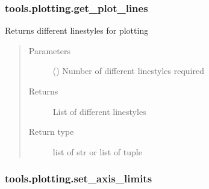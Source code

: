 \documentclass[letterpaper,10pt,english]{sphinxmanual}
\begin{document}
\subsubsection{tools.plotting.get\_plot\_lines}
\label{\detokenize{_autosummary/tools.plotting.get_plot_lines:tools-plotting-get-plot-lines}}\label{\detokenize{_autosummary/tools.plotting.get_plot_lines::doc}}

\begin{fulllineitems}
\label{\detokenize{_autosummary/tools.plotting.get_plot_lines:tools.plotting.get_plot_lines}}
\sphinxAtStartPar
Returns different line\sphinxhyphen{}styles for plotting
\begin{quote}\begin{description}
\item[{Parameters}] \leavevmode
\sphinxAtStartPar
{} (\sphinxstyleliteralemphasis{\sphinxupquote{, }}) \textendash{} Number of different line\sphinxhyphen{}styles required

\item[{Returns}] \leavevmode
\sphinxAtStartPar
{} \textendash{} List of different line\sphinxhyphen{}styles

\item[{Return type}] \leavevmode
\sphinxAtStartPar
list of str or list of tuple

\end{description}\end{quote}

\end{fulllineitems}



\subsubsection{tools.plotting.set\_axis\_limits}
\label{\detokenize{_autosummary/tools.plotting.set_axis_limits:tools-plotting-set-axis-limits}}\label{\detokenize{_autosummary/tools.plotting.set_axis_limits::doc}}
\end{document}
